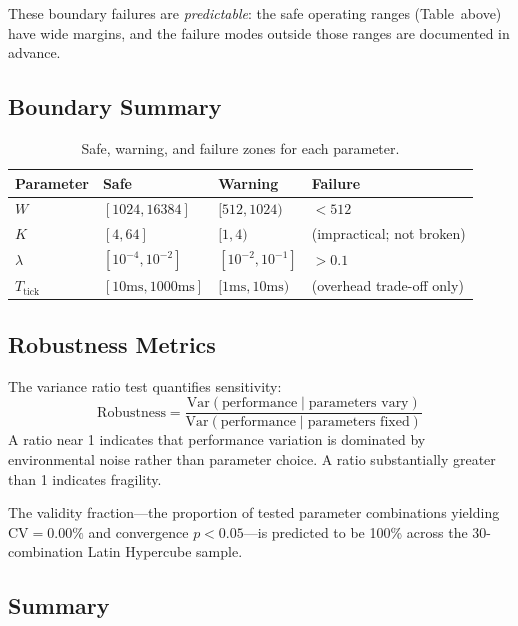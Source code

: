 These boundary failures are \emph{predictable}: the safe operating ranges
(Table~above) have wide margins, and the failure modes outside those ranges
are documented in advance.

\subsection{Boundary Summary}

\begin{table}[h]
\centering
\caption{Safe, warning, and failure zones for each parameter.}
\begin{tabular}{llll}
\toprule
\textbf{Parameter} & \textbf{Safe} & \textbf{Warning} & \textbf{Failure} \\
\midrule
$W$ & $[1024, 16384]$ & $[512, 1024)$ & $< 512$ \\
$K$ & $[4, 64]$ & $[1, 4)$ & (impractical; not broken) \\
$\lambda$ & $[10^{-4}, 10^{-2}]$ & $[10^{-2}, 10^{-1}]$ & $> 0.1$ \\
$T_{\text{tick}}$ & $[10\text{ms}, 1000\text{ms}]$ & $[1\text{ms}, 10\text{ms})$ & (overhead trade-off only) \\
\bottomrule
\end{tabular}
\end{table}

\subsection{Robustness Metrics}

The variance ratio test quantifies sensitivity:
\begin{equation}
  \text{Robustness} = \frac{\text{Var}(\text{performance} \mid \text{parameters vary})}
                           {\text{Var}(\text{performance} \mid \text{parameters fixed})}
\end{equation}
A ratio near 1 indicates that performance variation is dominated by
environmental noise rather than parameter choice. A ratio substantially
greater than 1 indicates fragility.

The validity fraction---the proportion of tested parameter combinations
yielding $\text{CV} = 0.00\%$ and convergence $p < 0.05$---is predicted to
be 100\% across the 30-combination Latin Hypercube sample.

\subsection{Summary}

